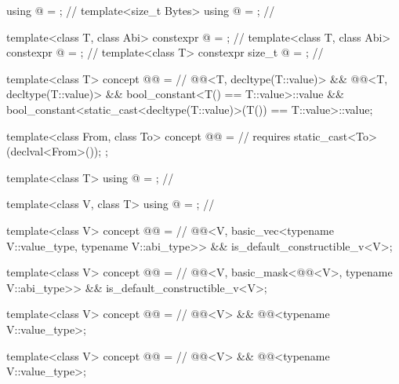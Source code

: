 \begin{codeblock}
using @ = \seebelownc@;                                    // \expos
template<size_t Bytes> using @ = \seebelownc@;               // \expos

template<class T, class Abi>
  constexpr @  = \seebelownc@;                  // \expos
template<class T, class Abi>
  constexpr @  = \seebelownc@;                  // \expos
template<class T> constexpr size_t @ = \seebelownc@;    // \expos

template<class T>
  concept @@ =                                   // \expos
    @@<T, decltype(T::value)> &&
    @@<T, decltype(T::value)> &&
    bool_constant<T() == T::value>::value &&
    bool_constant<static_cast<decltype(T::value)>(T()) == T::value>::value;

template<class From, class To>
  concept @@ =                                // \expos
    requires {
      static_cast<To>(declval<From>());
    };

template<class T> using @ = \seebelownc@;                   // \expos

template<class V, class T> using @ = \seebelownc@; // \expos

template<class V>
  concept @@ =                                            // \expos
    @@<V, basic_vec<typename V::value_type, typename V::abi_type>> &&
    is_default_constructible_v<V>;

template<class V>
  concept @@ =                                           // \expos
    @@<V, basic_mask<@@<V>, typename V::abi_type>> &&
    is_default_constructible_v<V>;

template<class V>
  concept @@ =                                      // \expos
    @@<V> && @@<typename V::value_type>;

template<class V>
  concept @@ =                                            // \expos
    @@<V> && @@<typename V::value_type>;


\end{codeblock}
